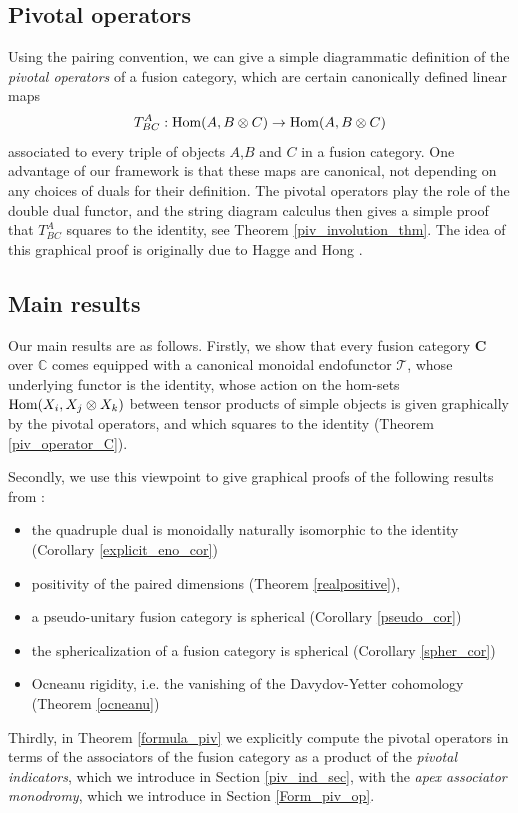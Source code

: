 \documentclass[a4paper]{article}
\theoremstyle{plain}
\theoremstyle{definition}
\newcommand{\Hom}{\operatorname{\text{\rm Hom}}}
\newcommand{\cat}{\mathbf}
\begin{document}
\subsection*{Pivotal operators}

Using the pairing convention, we can give a simple diagrammatic definition of the {\em pivotal operators} of a fusion category, which are certain canonically defined linear maps
\[
 T^A_{BC} : \Hom(A, B \otimes C) \rightarrow \Hom(A, B \otimes C)
\]
associated to every triple of objects $A$,$B$ and $C$ in a fusion category. One advantage of our framework is that these maps are canonical, not depending on any choices of duals for their definition. The pivotal operators play the role of the double dual functor, and the string diagram calculus then gives a simple proof that $T^A_{BC}$ squares to the identity, see Theorem \ref{piv_involution_thm}. The idea of this graphical proof is originally due to Hagge and Hong \cite{hh09-snbfcor3}.

\subsection*{Main results}
Our main results are as follows. Firstly, we show that every fusion category $\cat{C}$ over $\mathbb{C}$ comes equipped with a canonical monoidal endofunctor $\mathcal{T}$, whose underlying functor is the identity, whose action on the hom-sets $\Hom(X_i, X_j \otimes X_k)$ between tensor products of simple objects is given graphically by the pivotal operators, and which squares to the identity (Theorem \ref{piv_operator_C}). 

Secondly, we use this viewpoint to give graphical proofs of the following results from \cite{eno02-ofc}: 
\begin{itemize}
\item the quadruple dual is monoidally naturally isomorphic to the identity (Corollary \eqref{explicit_eno_cor})
\item positivity of the paired dimensions (Theorem \ref{realpositive}), 
\item a pseudo-unitary fusion category is spherical (Corollary \ref{pseudo_cor})
\item the sphericalization of a fusion category is spherical (Corollary \ref{spher_cor})
\item Ocneanu rigidity, i.e. the vanishing of the Davydov-Yetter cohomology (Theorem \ref{ocneanu})
\end{itemize}
Thirdly, in Theorem \ref{formula_piv} we explicitly compute the pivotal operators in terms of the associators of the fusion category as a product of the {\em pivotal indicators}, which we introduce in Section \ref{piv_ind_sec}, with the {\em apex associator monodromy}, which we introduce in Section \ref{Form_piv_op}. 
\end{document}

